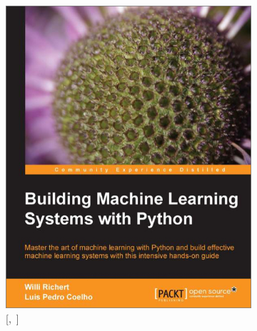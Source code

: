 \begin{figure}[ht]
  \centering
  \begin{subfigure}[b]{0.35\textwidth}
    \centering
    \includegraphics[width=\textwidth]{figures/ch_01/richert2013building.jpg}
    \vspace{10pt}
    \caption{[\citeauthor{richert2013building},~\citeyear{richert2013building}]}
    \label{fig:1.2.a}
  \end{subfigure}
  \hspace{20mm}
  \begin{subfigure}[b]{0.35\textwidth}
    \centering

\end{subfigure}
\end{figure}
